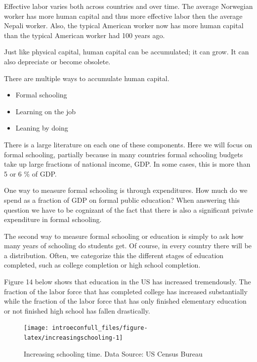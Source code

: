 \documentclass[
]{book}
\providecommand{\tightlist}{%
  \setlength{\itemsep}{0pt}\setlength{\parskip}{0pt}}
\begin{document}
Effective labor varies both across countries and over time. The average Norwegian worker has more human capital and thus more effective labor then the average Nepali worker. Also, the typical American worker now has more human capital than the typical American worker had 100 years ago.

Just like physical capital, human capital can be accumulated; it can grow. It can also depreciate or become obsolete.

There are multiple ways to accumulate human capital.

\begin{itemize}
\tightlist
\item
  Formal schooling
\item
  Learning on the job
\item
  Leaning by doing
\end{itemize}

There is a large literature on each one of these components. Here we will focus on formal schooling, partially because in many countries formal schooling budgets take up large fractions of national income, GDP. In some cases, this is more than 5 or 6 \% of GDP.

One way to measure formal schooling is through expenditures. How much do we spend as a fraction of GDP on formal public education? When answering this question we have to be cognizant of the fact that there is also a significant private expenditure in formal schooling.

The second way to measure formal schooling or education is simply to ask how many years of schooling do students get. Of course, in every country there will be a distribution. Often, we categorize this the different stages of education completed, such as college completion or high school completion.

Figure 14 below shows that education in the US has increased tremendously. The fraction of the labor force that has completed college has increased substantially while the fraction of the labor force that has only finished elementary education or not finished high school has fallen drastically.

\begin{figure}

{\centering \texttt{[image: introeconfull\_files/figure-latex/increasingschooling-1]} 

}

\caption{Increasing schooling time. Data Source: US Census Bureau}\label{fig:increasingschooling}
\end{figure}
\end{document}
